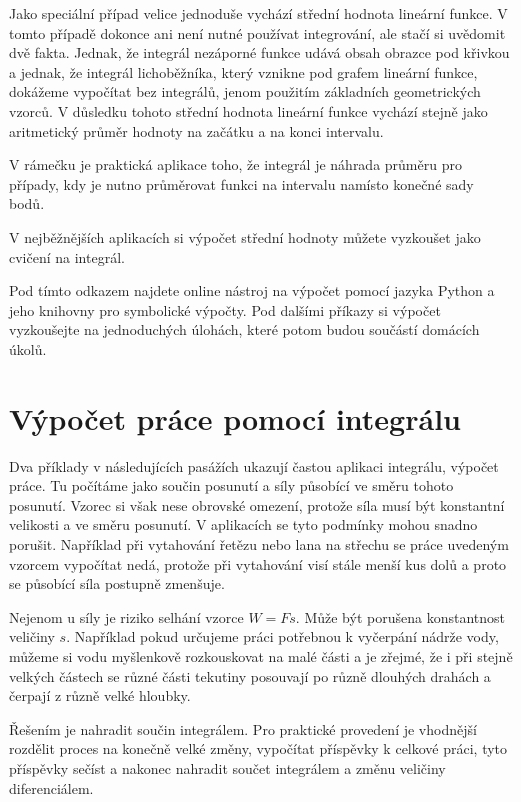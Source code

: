 \documentclass[12pt]{article}
\begin{document}
Jako speciální případ velice jednoduše vychází střední hodnota lineární funkce. V tomto případě dokonce ani není nutné používat integrování, ale stačí si uvědomit dvě fakta. Jednak, že integrál nezáporné funkce udává obsah obrazce pod křivkou a jednak, že integrál lichoběžníka, který vznikne pod grafem lineární funkce, dokážeme vypočítat bez integrálů, jenom použitím základních geometrických vzorců. V důsledku tohoto střední hodnota lineární funkce vychází stejně jako aritmetický průměr hodnoty na začátku a na konci intervalu.

V rámečku je praktická aplikace toho, že integrál je náhrada průměru pro případy, kdy je nutno průměrovat funkci na intervalu namísto konečné sady bodů.


V nejběžnějších aplikacích si výpočet střední hodnoty můžete vyzkoušet jako cvičení na integrál.

Pod tímto odkazem najdete online nástroj na výpočet pomocí jazyka Python a jeho knihovny pro symbolické výpočty. Pod dalšími příkazy si výpočet vyzkoušejte na jednoduchých úlohách, které potom budou součástí domácích úkolů.


\section*{Výpočet práce pomocí integrálu}

Dva příklady v následujících pasážích ukazují častou aplikaci integrálu, výpočet práce. Tu počítáme jako součin posunutí a síly působící ve směru tohoto posunutí. Vzorec si však nese obrovské omezení, protože síla musí být konstantní velikosti a ve směru posunutí. V aplikacích se tyto podmínky mohou snadno porušit. Například při vytahování řetězu nebo lana na střechu se práce uvedeným vzorcem vypočítat nedá, protože při vytahování visí stále menší kus dolů a proto se působící síla postupně zmenšuje.

Nejenom u síly je riziko selhání vzorce $W=Fs$. Může být porušena konstantnost veličiny $s$. Například pokud určujeme práci potřebnou k vyčerpání nádrže vody, můžeme si vodu myšlenkově rozkouskovat na malé části a je zřejmé, že i při stejně velkých částech se různé části tekutiny posouvají po různě dlouhých drahách a čerpají z různě velké hloubky.

Řešením je nahradit součin integrálem. Pro praktické provedení je vhodnější rozdělit proces na konečně velké změny, vypočítat příspěvky k celkové práci, tyto příspěvky sečíst a nakonec nahradit součet integrálem a změnu veličiny diferenciálem.
\end{document}
